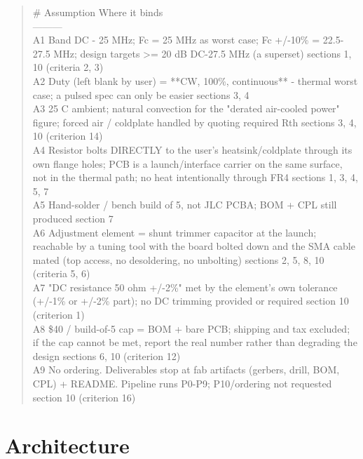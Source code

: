 \documentclass[11pt,a4paper]{article}
\begin{document}
\begin{quote}\small\ttfamily\raggedright
\textbar{} \# \textbar{} Assumption \textbar{} Where it binds \textbar{}\\
\textbar{}---\textbar{}---\textbar{}---\textbar{}\\
\textbar{} A1 \textbar{} Band DC - 25 MHz; Fc = 25 MHz as worst case; Fc +/-10\% = 22.5-27.5 MHz; design targets \textgreater{}= 20 dB DC-27.5 MHz (a superset) \textbar{} sections 1, 10 (criteria 2, 3) \textbar{}\\
\textbar{} A2 \textbar{} Duty (left blank by user) = {*}{*}CW, 100\%, continuous{*}{*} - thermal worst case; a pulsed spec can only be easier \textbar{} sections 3, 4 \textbar{}\\
\textbar{} A3 \textbar{} 25 C ambient; natural convection for the "derated air-cooled power" figure; forced air / coldplate handled by quoting required Rth \textbar{} sections 3, 4, 10 (criterion 14) \textbar{}\\
\textbar{} A4 \textbar{} Resistor bolts DIRECTLY to the user's heatsink/coldplate through its own flange holes; PCB is a launch/interface carrier on the same surface, not in the thermal path; no heat intentionally through FR4 \textbar{} sections 1, 3, 4, 5, 7 \textbar{}\\
\textbar{} A5 \textbar{} Hand-solder / bench build of 5, not JLC PCBA; BOM + CPL still produced \textbar{} section 7 \textbar{}\\
\textbar{} A6 \textbar{} Adjustment element = shunt trimmer capacitor at the launch; reachable by a tuning tool with the board bolted down and the SMA cable mated (top access, no desoldering, no unbolting) \textbar{} sections 2, 5, 8, 10 (criteria 5, 6) \textbar{}\\
\textbar{} A7 \textbar{} "DC resistance 50 ohm +/-2\%" met by the element's own tolerance (+/-1\% or +/-2\% part); no DC trimming provided or required \textbar{} section 10 (criterion 1) \textbar{}\\
\textbar{} A8 \textbar{} \$40 / build-of-5 cap = BOM + bare PCB; shipping and tax excluded; if the cap cannot be met, report the real number rather than degrading the design \textbar{} sections 6, 10 (criterion 12) \textbar{}\\
\textbar{} A9 \textbar{} No ordering. Deliverables stop at fab artifacts (gerbers, drill, BOM, CPL) + README. Pipeline runs P0-P9; P10/ordering not requested \textbar{} section 10 (criterion 16) \textbar{}
\end{quote}
\section{Architecture}
\end{document}
